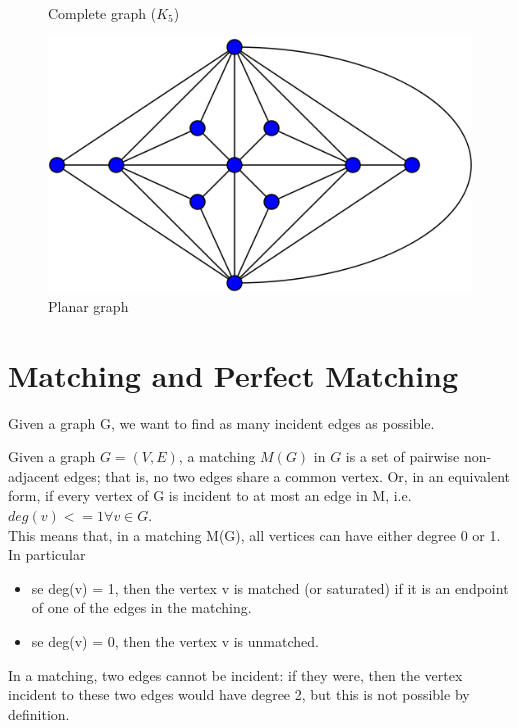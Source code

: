 \begin{figure}[htbp]
\begin{minipage}[htbp]{.50\textwidth}
\caption{Complete graph ($K_{5}$)}
\end{minipage}
\medskip
\begin{minipage}[htbp]{.50\textwidth}
\centering
\includegraphics[width=.60\textwidth]{planare.png}
\caption{Planar graph}
\end{minipage}
\end{figure}
\section{Matching and Perfect Matching}
Given a graph G, we want to find as many incident edges as possible.

\begin{definition}
Given a graph $G = (V,E)$, a matching $M(G)$ in $G$ is a set of pairwise non-adjacent edges; that is, no two edges share a common vertex. Or, in an equivalent form, if every vertex of G is incident to at most an edge in M, i.e. $deg(v)<= 1 \forall v\in G$.\\
This means that, in a matching M(G), all vertices can have either degree 0 or 1. In particular
\begin{itemize}
\item se deg(v) = 1, then the vertex v is matched (or saturated) if it is an endpoint of one of the edges in the matching.
\item se deg(v) = 0, then the vertex v is unmatched.
\end{itemize}
In a matching, two edges cannot be incident: if they were, then the vertex incident to these two edges would have degree 2, but this is not possible by definition.
\end{definition}

